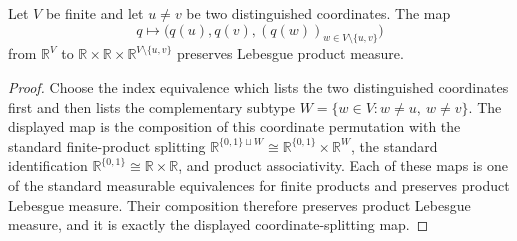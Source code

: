 \begin{helper}
Let \(V\) be finite and let \(u\ne v\) be two distinguished coordinates.
The map
\[
q\longmapsto \bigl(q(u),q(v),(q(w))_{w\in V\setminus\{u,v\}}\bigr)
\]
from \(\mathbb R^V\) to
\(\mathbb R\times\mathbb R\times\mathbb R^{V\setminus\{u,v\}}\) preserves
Lebesgue product measure.
\end{helper}
\begin{proof}
Choose the index equivalence which lists the two distinguished coordinates
first and then lists the complementary subtype
\(W=\{w\in V:w\ne u,\ w\ne v\}\).  The displayed map is the composition of
this coordinate permutation with the standard finite-product splitting
\(\mathbb R^{\{0,1\}\sqcup W}\cong\mathbb R^{\{0,1\}}\times\mathbb R^W\),
the standard identification \(\mathbb R^{\{0,1\}}\cong\mathbb R\times
\mathbb R\), and product associativity.  Each of these maps is one of the
standard measurable equivalences for finite products and preserves product
Lebesgue measure.  Their composition therefore preserves product Lebesgue
measure, and it is exactly the displayed coordinate-splitting map.
\end{proof}

